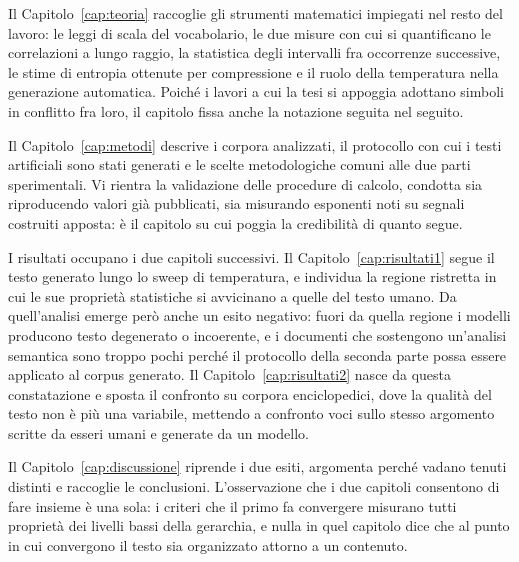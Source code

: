 Il Capitolo~\ref{cap:teoria} raccoglie gli strumenti matematici impiegati nel
resto del lavoro: le leggi di scala del vocabolario, le due misure con cui si
quantificano le correlazioni a lungo raggio, la statistica degli intervalli fra
occorrenze successive, le stime di entropia ottenute per compressione e il ruolo
della temperatura nella generazione automatica. Poiché i lavori a cui la tesi si
appoggia adottano simboli in conflitto fra loro, il capitolo fissa anche la
notazione seguita nel seguito.

Il Capitolo~\ref{cap:metodi} descrive i corpora analizzati, il protocollo con cui
i testi artificiali sono stati generati e le scelte metodologiche comuni alle due
parti sperimentali. Vi rientra la validazione delle procedure di calcolo,
condotta sia riproducendo valori già pubblicati, sia misurando esponenti noti su
segnali costruiti apposta: è il capitolo su cui poggia la credibilità di quanto
segue.

I risultati occupano i due capitoli successivi. Il
Capitolo~\ref{cap:risultati1} segue il testo generato lungo lo sweep di
temperatura, e individua la regione ristretta in cui le sue proprietà
statistiche si avvicinano a quelle del testo umano. Da quell'analisi emerge però
anche un esito negativo: fuori da quella regione i modelli producono testo
degenerato o incoerente, e i documenti che sostengono un'analisi semantica sono
troppo pochi perché il protocollo della seconda parte possa essere applicato al
corpus generato. Il Capitolo~\ref{cap:risultati2} nasce da questa constatazione e
sposta il confronto su corpora enciclopedici, dove la qualità del testo non è più
una variabile, mettendo a confronto voci sullo stesso argomento scritte da esseri
umani e generate da un modello.

Il Capitolo~\ref{cap:discussione} riprende i due esiti, argomenta perché vadano
tenuti distinti e raccoglie le conclusioni. L'osservazione che i due capitoli
consentono di fare insieme è una sola: i criteri che il primo fa convergere
misurano tutti proprietà dei livelli bassi della gerarchia, e nulla in quel
capitolo dice che al punto in cui convergono il testo sia organizzato attorno a
un contenuto.
